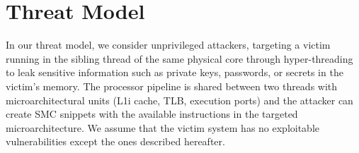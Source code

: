 \section{Threat Model}\label{sec:Threat Model}
In our threat model, we consider unprivileged attackers, targeting a victim running in the sibling thread of the same physical core through hyper-threading to leak sensitive information such as private keys, passwords, or secrets in the victim's memory. The processor pipeline is shared between two threads with microarchitectural units (L1i cache, TLB, execution ports) and the attacker can create SMC snippets with the available instructions in the targeted microarchitecture. We assume that the victim system has no exploitable vulnerabilities except the ones described hereafter.
